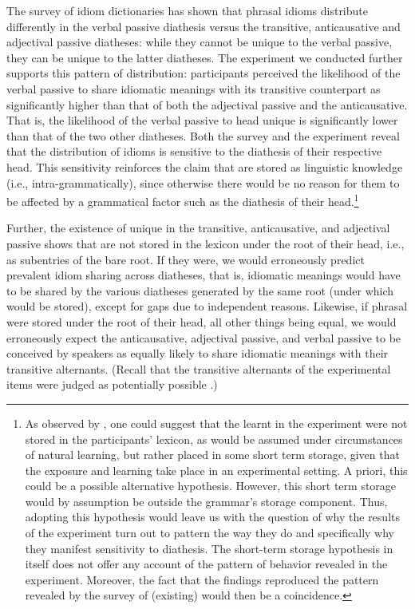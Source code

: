\documentclass[output=paper]{langsci/langscibook}
\begin{document}
The survey of  idiom dictionaries has shown that phrasal idioms
distribute differently in the verbal passive diathesis versus the transitive,
anticausative and adjectival passive diatheses: while they cannot be unique to
the verbal passive, they can be unique to the latter diatheses. The experiment
we conducted further supports this pattern of distribution: participants
perceived the likelihood of the verbal passive to share idiomatic meanings with
its transitive counterpart as significantly higher than that of both the
adjectival passive and the anticausative. That is, the likelihood of the verbal
passive to head unique  is significantly lower than that of the two other
diatheses. Both the survey and the experiment reveal that the distribution of
idioms is sensitive to the diathesis of their respective head.  This
sensitivity reinforces the claim that  are stored as linguistic knowledge
(i.e., intra-grammatically), since otherwise there would be no reason for them
to be affected by a grammatical factor such as the diathesis of their
head.\footnote{As observed by \textcite{SilHorKluWex2018}, one could suggest that
    the learnt  in the experiment were not stored in the participants'
    lexicon, as would be assumed under circumstances of natural learning, but
    rather placed in some short term storage, given that the exposure and
    learning take place in an experimental setting. A priori, this could be a
    possible alternative hypothesis.  However, this short term storage would by
    assumption be outside the grammar’s storage component. Thus, adopting this
    hypothesis would leave us with the question of why the results of the
    experiment turn out to pattern the way they do and specifically why they
    manifest sensitivity to diathesis. The short-term storage hypothesis in
    itself does not offer any account of the pattern of behavior revealed in
    the experiment. Moreover, the fact that the findings reproduced the pattern
    revealed by the survey of (existing)  would then be a coincidence. }

Further, the existence of unique  in the transitive, anticausative, and
adjectival passive shows that  are not stored in the lexicon under the
root of their head, i.e., as subentries of the bare root. If they were, we
would erroneously predict prevalent idiom sharing across diatheses, that is,
idiomatic meanings would have to be shared by the various diatheses generated
by the same root (under which  would be stored), except for gaps due to
independent reasons. Likewise, if phrasal  were stored under the root of
their head, all other things being equal, we would erroneously expect the
anticausative, adjectival passive, and verbal passive to be conceived by
speakers as equally likely to share idiomatic meanings with their transitive
alternants. (Recall that the transitive alternants of the experimental items
were judged as potentially possible .)
\end{document}
